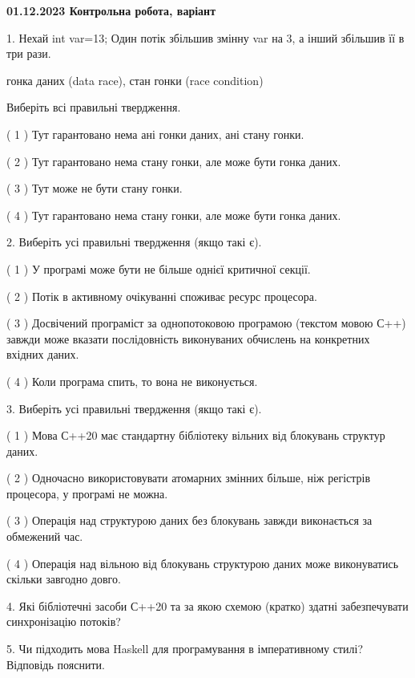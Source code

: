 \documentclass[12pt, ukrainian]{article}
\begin{document}
\vspace{4mm}
\newpage
\begin {large}

\textbf{01.12.2023 Контрольна робота, варіант  }\par


{
1. Нехай int var=13; Один потік збільшив змінну var на 3, а інший збільшив її в три рази.

гонка даних (data race), стан гонки (race condition)

Виберіть всі правильні твердження.\par
\vspace{2mm}
( 1 ) Тут гарантовано нема ані гонки даних, ані стану гонки.%

( 2 ) Тут гарантовано нема стану гонки, але може бути гонка даних.%

( 3 ) Тут може не бути стану гонки.%

( 4 ) Тут гарантовано нема стану гонки, але може бути гонка даних.%


\vspace{5mm}
2. Виберіть усі правильні твердження (якщо такі є).\par
\vspace{2mm}

( 1 ) У програмі може бути не більше однієї критичної секції.%

( 2 ) Потік в активному очікуванні споживає ресурс процесора.%

( 3 ) Досвічений програміст за однопотоковою програмою (текстом мовою С++) завжди може вказати послідовність виконуваних обчислень на конкретних вхідних даних.%

( 4 ) Коли програма спить, то вона не виконується.%


\vspace{5mm}
3. Виберіть усі правильні твердження (якщо такі є).\par
\vspace{2mm}

( 1 ) Мова С++20 має стандартну бібліотеку вільних від блокувань структур даних.%

( 2 ) Одночасно використовувати атомарних змінних більше, ніж регістрів процесора, у програмі не можна.%

( 3 ) Операція над структурою даних без блокувань завжди виконається за обмежений час.%

( 4 ) Операція над вільною від блокувань структурою даних може виконуватись скільки завгодно довго.%


\vspace{5mm}
4. Які бібліотечні засоби С++20 та за якою схемою (кратко) здатні забезпечувати синхронізацію потоків?



\vspace{5mm}
5. Чи підходить мова Haskell для програмування в імперативному стилі? Відповідь пояснити.
}
\end {large}
\end{document}
